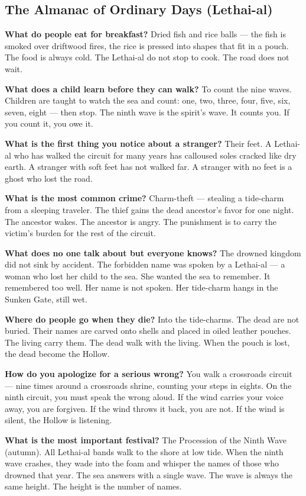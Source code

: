 \subsection*{The Almanac of Ordinary Days (Lethai-al)}
\begin{almanac}
\textbf{What do people eat for breakfast?} Dried fish and rice balls --- the fish is smoked over driftwood fires, the rice is pressed into shapes that fit in a pouch. The food is always cold. The Lethai-al do not stop to cook. The road does not wait.

\textbf{What does a child learn before they can walk?} To count the nine waves. Children are taught to watch the sea and count: one, two, three, four, five, six, seven, eight --- then stop. The ninth wave is the spirit's wave. It counts you. If you count it, you owe it.

\textbf{What is the first thing you notice about a stranger?} Their feet. A Lethai-al who has walked the circuit for many years has calloused soles cracked like dry earth. A stranger with soft feet has not walked far. A stranger with no feet is a ghost who lost the road.

\textbf{What is the most common crime?} Charm-theft --- stealing a tide-charm from a sleeping traveler. The thief gains the dead ancestor's favor for one night. The ancestor wakes. The ancestor is angry. The punishment is to carry the victim's burden for the rest of the circuit.

\textbf{What does no one talk about but everyone knows?} The drowned kingdom did not sink by accident. The forbidden name was spoken by a Lethai-al --- a woman who lost her child to the sea. She wanted the sea to remember. It remembered too well. Her name is not spoken. Her tide-charm hangs in the Sunken Gate, still wet.

\textbf{Where do people go when they die?} Into the tide-charms. The dead are not buried. Their names are carved onto shells and placed in oiled leather pouches. The living carry them. The dead walk with the living. When the pouch is lost, the dead become the Hollow.

\textbf{How do you apologize for a serious wrong?} You walk a crossroads circuit --- nine times around a crossroads shrine, counting your steps in eights. On the ninth circuit, you must speak the wrong aloud. If the wind carries your voice away, you are forgiven. If the wind throws it back, you are not. If the wind is silent, the Hollow is listening.

\textbf{What is the most important festival?} The Procession of the Ninth Wave (autumn). All Lethai-al bands walk to the shore at low tide. When the ninth wave crashes, they wade into the foam and whisper the names of those who drowned that year. The sea answers with a single wave. The wave is always the same height. The height is the number of names.


\end{almanac}
